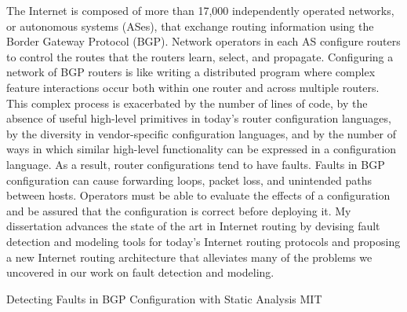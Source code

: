 \documentclass{article}
\begin{document}
\begin{cv}{}
    The Internet is composed of more than 17,000 independently operated
    networks, or autonomous systems (ASes), that exchange routing
    information using the Border Gateway Protocol (BGP).  Network
    operators in each AS configure routers to control the routes that
    the routers learn, select, and propagate.  Configuring a network of
    BGP routers is like writing a distributed program where complex
    feature interactions occur both within one router and across
    multiple routers.  This complex process is exacerbated by the number
    of lines of code, by the absence of useful high-level primitives in
    today's router configuration languages, by the diversity in
    vendor-specific configuration languages, and by the number of ways
    in which similar high-level functionality can be expressed in a
    configuration language.  As a result, router configurations tend to
    have faults.  Faults in BGP configuration can cause forwarding
    loops, packet loss, and unintended paths between hosts.  Operators
    must be able to evaluate the effects of a configuration and be
    assured that the configuration is correct before deploying it.  My
    dissertation advances the state of the art in Internet routing by
    devising fault detection and modeling tools for today's Internet
    routing protocols and proposing a new Internet routing architecture
    that alleviates many of the problems we uncovered in our work on
    fault detection and modeling.



{\mf Detecting Faults in BGP Configuration with Static Analysis} \hfill MIT
\vspace*{-0.1in}


\end{cv}
\end{document}
